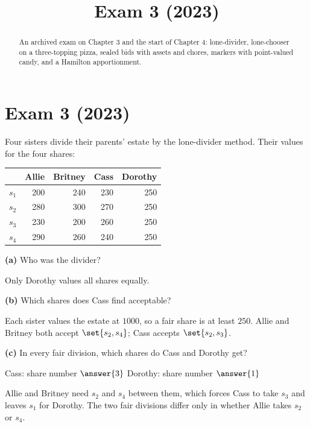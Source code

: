 \documentclass[12pt]{ximera}
\title{Exam 3 (2023)}
\begin{document}
\begin{abstract}
An archived exam on Chapter 3 and the start of Chapter 4: lone-divider, lone-chooser on a three-topping pizza, sealed bids with assets and chores, markers with point-valued candy, and a Hamilton apportionment.
\end{abstract}
\maketitle

\section*{Exam 3 (2023)}

\begin{problem}
Four sisters divide their parents' estate by the lone-divider method. Their values for
the four shares:
\begin{center}
\begin{tabular}{r|rrrr}
 & Allie & Britney & Cass & Dorothy\\\hline
$s_1$ & 200 & 240 & 230 & 250\\
$s_2$ & 280 & 300 & 270 & 250\\
$s_3$ & 230 & 200 & 260 & 250\\
$s_4$ & 290 & 260 & 240 & 250
\end{tabular}
\end{center}

\begin{prompt}
\textbf{(a)} Who was the divider?
\begin{multipleChoice}
\end{multipleChoice}
\begin{feedback}
Only Dorothy values all shares equally.
\end{feedback}
\end{prompt}

\begin{prompt}
\textbf{(b)} Which shares does Cass find acceptable?
\begin{selectAll}
\end{selectAll}
\begin{feedback}
Each sister values the estate at $1000$, so a fair share is at least $250$. Allie and
Britney both accept $\set{s_2,s_4}$; Cass accepts $\set{s_2,s_3}$.
\end{feedback}
\end{prompt}

\begin{prompt}
\textbf{(c)} In every fair division, which shares do Cass and Dorothy get?

Cass: share number $\answer{3}$ \quad Dorothy: share number $\answer{1}$
\begin{feedback}
Allie and Britney need $s_2$ and $s_4$ between them, which forces Cass to take $s_3$ and
leaves $s_1$ for Dorothy. The two fair divisions differ only in whether Allie takes
$s_2$ or $s_4$.
\end{feedback}
\end{prompt}
\end{problem}
\end{document}
